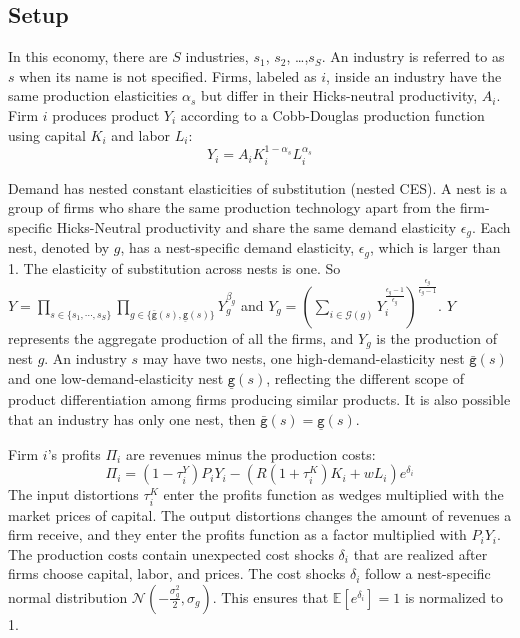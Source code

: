 \documentclass[12pt]{article}
\newcommand{\E}{\mathbb{E}} %
\begin{document}
\subsection{Setup}
In this economy, there are $S$ industries, $s_1$, $s_2$, \ldots ,$s_S$. An industry is referred to as $s$ when its name is not specified. Firms, labeled as $i$, inside an industry have the same production elasticities $\alpha_{s}$ but differ in their Hicks-neutral productivity, $A_i$. Firm $i$ produces product $Y_i$ according to a Cobb-Douglas production function using capital $K_i$ and labor $L_i$: 
$$Y_{i}=A_{i}K_{i}^{1-\alpha_{s}}L_{i}^{\alpha_{s}}$$

Demand has nested constant elasticities of substitution (nested CES). A nest is a group of firms who share the same production technology apart from the firm-specific Hicks-Neutral productivity and share the same demand elasticity $\epsilon_g$. Each nest, denoted by $g$, has a nest-specific demand elasticity, $\epsilon_g$, which is larger than 1. The elasticity of substitution across nests is one. So $Y=\prod_{s \in \{s_1, \cdots, s_S \} }\prod_{g\in\{\bar{\mathtt{g}}(s), \underline{\mathtt{g}}(s)\}} Y_g^{\beta_g}$ and $
Y_g=\left( \sum_{i \in \mathcal{G}(g)} Y_i^{\frac{\epsilon_g-1}{\epsilon_g}} \right)^{\frac{\epsilon_g}{\epsilon_g-1}}$.
$Y$ represents the aggregate production of all the firms, and $Y_g$ is the production of nest $g$. An industry $s$ may have two nests, one high-demand-elasticity nest $\bar{\mathtt{g}}(s)$ and one low-demand-elasticity nest $\underline{\mathtt{g}}(s)$, reflecting the different scope of product differentiation among firms producing similar products. It is also possible that an industry has only one nest, then $\bar{\mathtt{g}}(s)=\underline{\mathtt{g}}(s)$. \label{par:ch3nestDef}

Firm $i$'s profits $\Pi_i$ are revenues minus the production costs:
$$\Pi_i=(1-\tau_i^Y )P_iY_i-(R(1+\tau_i^K )K_i+wL_i)e^{\delta_i}$$
The input distortions $\tau_i^K$ enter the profits function as wedges multiplied with the market prices of capital. The output distortions changes the amount of revenues a firm receive, and they enter the profits function as a factor multiplied with $P_iY_i$. The production costs contain unexpected cost shocks $\delta_i$ that are realized after firms choose capital, labor, and prices. The cost shocks $\delta_i$ follow a nest-specific normal distribution $\mathcal{N}\left( -\frac{\sigma_g^2}{2},\sigma_g \right)$. This ensures that $\E[e^{\delta_i}]=1$ is normalized to 1.
\end{document}
